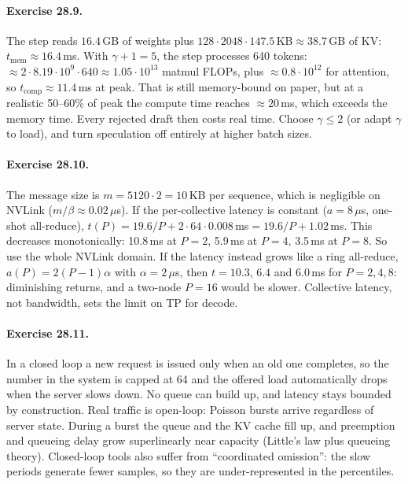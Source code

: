 \paragraph{Exercise 28.9.} The step reads $16.4$\,GB of weights plus
$128\cdot2048\cdot147.5$\,KB$\approx38.7$\,GB of KV: $t_{\text{mem}}\approx16.4$\,ms. With
$\gamma+1=5$, the step processes 640 tokens: $\approx2\cdot8.19\cdot10^9\cdot640\approx
1.05\cdot10^{13}$ matmul FLOPs, plus $\approx0.8\cdot10^{12}$ for attention, so
$t_{\text{comp}}\approx11.4$\,ms at peak. That is still memory-bound on paper, but at a
realistic 50--60\% of peak the compute time reaches $\approx20$\,ms, which exceeds the
memory time. Every rejected draft then costs real time. Choose $\gamma\le2$ (or adapt
$\gamma$ to load), and turn speculation off entirely at higher batch sizes.

\paragraph{Exercise 28.10.} The message size is $m=5120\cdot2=10$\,KB per sequence, which
is negligible on NVLink ($m/\beta\approx0.02\,\mu$s). If the per-collective latency is
constant ($a=8\,\mu$s, one-shot all-reduce),
$t(P)=19.6/P+2\cdot64\cdot0.008$\,ms$=19.6/P+1.02$\,ms. This decreases monotonically:
10.8\,ms at $P=2$, 5.9\,ms at $P=4$, 3.5\,ms at $P=8$. So use the whole NVLink domain. If
the latency instead grows like a ring all-reduce, $a(P)=2(P-1)\alpha$ with
$\alpha=2\,\mu$s, then $t=10.3$, $6.4$ and $6.0$\,ms for $P=2,4,8$: diminishing returns,
and a two-node $P=16$ would be slower. Collective latency, not bandwidth, sets the limit
on TP for decode.

\paragraph{Exercise 28.11.} In a closed loop a new request is issued only when an old one
completes, so the number in the system is capped at 64 and the offered load automatically
drops when the server slows down. No queue can build up, and latency stays bounded by
construction. Real traffic is open-loop: Poisson bursts arrive regardless of server
state. During a burst the queue and the KV cache fill up, and preemption and queueing
delay grow superlinearly near capacity (Little's law plus queueing theory). Closed-loop
tools also suffer from ``coordinated omission'': the slow periods generate fewer samples,
so they are under-represented in the percentiles.

